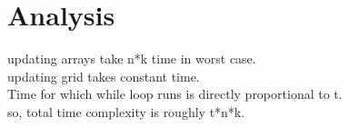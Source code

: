 \documentclass[12pt]{article}
\begin{document}
\section{Analysis}
updating arrays take n*k time in worst case.\\
updating grid takes constant time.\\
Time for which while loop runs is directly proportional to t.\\
so, total time complexity is roughly t*n*k.



\end{document}
